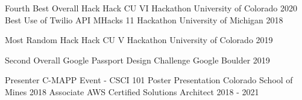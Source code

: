 
\vspace{-2.0mm}

\begin{cvhonors}


  \cvhonor
  {Fourth Best Overall Hack}
  {Hack CU VI Hackathon}
  {University of Colorado}
  {2020}
  \cvhonor
    {Best Use of Twilio API} %
    {MHacks 11 Hackathon}
    {University of Michigan} %
    {2018} %

  \cvhonor
    {Most Random Hack} %
    {Hack CU V Hackathon}
    {University of Colorado} %
    {2019} %
  
  \cvhonor
  {Second Overall}
  {Google Passport Design Challenge}
  {Google Boulder}
  {2019}

    \cvhonor
    {Presenter} %
    {C-MAPP Event - CSCI 101 Poster Presentation}
    {Colorado School of Mines} %
    {2018} %
  \cvhonor
    {Associate} %
    {AWS Certified Solutions Architect }
    {} %
    {2018 - 2021} %

\end{cvhonors}
